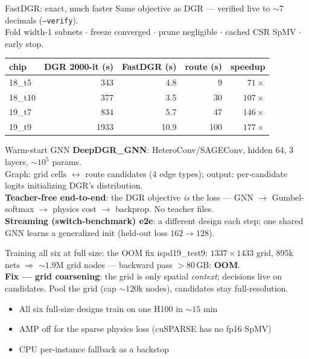 \documentclass[10pt]{beamer}
\begin{document}
\begin{frame}{FastDGR: exact, much faster}
Same objective as DGR --- verified live to ${\sim}7$ decimals
(\texttt{--verify}).\\[4pt]
Fold width-1 subnets $\cdot$ freeze converged $\cdot$ prune negligible
$\cdot$ cached CSR SpMV $\cdot$ early stop.\\[8pt]
\centering\small
\begin{tabular}{lrrrr}
\toprule
chip & DGR 2000-it (s) & FastDGR (s) & route (s) & speedup\\
\midrule
18\_t5 & 343 & 4.8 & 9 & $71\times$\\
18\_t10 & 377 & 3.5 & 30 & $107\times$\\
19\_t7 & 834 & 5.7 & 47 & $146\times$\\
19\_t9 & 1933 & 10.9 & 100 & $177\times$\\
\bottomrule
\end{tabular}
\end{frame}

\begin{frame}{Warm-start GNN}
\textbf{DeepDGR\_GNN}: HeteroConv/SAGEConv, hidden 64, 3 layers,
${\sim}10^5$ params.\\
Graph: grid cells $\leftrightarrow$ route candidates (4 edge types);
output: per-candidate logits initializing DGR's distribution.\\[8pt]
\textbf{Teacher-free end-to-end}: the DGR objective \emph{is} the loss ---
GNN $\to$ Gumbel-softmax $\to$ physics cost $\to$ backprop.
No teacher files.\\[4pt]
\textbf{Streaming (switch-benchmark) e2e}: a different design each step;
one shared GNN learns a generalized init (held-out loss $162\to128$).
\end{frame}

\begin{frame}{Training all six at full size: the OOM fix}
ispd19\_test9: $1337\times1433$ grid, 895k nets $\Rightarrow$ ${\sim}1.9$M
grid nodes --- backward pass $>80$\,GB: \textbf{OOM}.\\[8pt]
\textbf{Fix --- grid coarsening}: the grid is only spatial \emph{context};
decisions live on candidates. Pool the grid (cap ${\sim}120$k nodes),
candidates stay full-resolution.\\[8pt]
\begin{itemize}
\item All six full-size designs train on one H100 in ${\sim}15$ min
\item AMP off for the sparse physics loss (cuSPARSE has no fp16 SpMV)
\item CPU per-instance fallback as a backstop
\end{itemize}
\end{frame}
\end{document}
